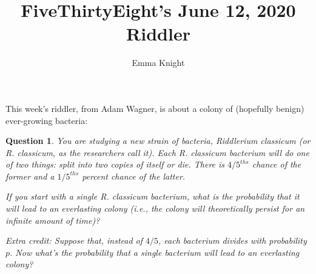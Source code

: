 \documentclass[11pt]{article}
\title{FiveThirtyEight's June 12, 2020 Riddler}
\author{Emma Knight}
\newtheorem{question}[theorem]{Question}
\theoremstyle{definition}
\begin{document}
\maketitle
This week's riddler, from Adam Wagner, is about a colony of (hopefully benign) ever-growing bacteria:
\begin{question}
You are studying a new strain of bacteria, \emph{Riddlerium classicum} (or \emph{R. classicum}, as the researchers call it). Each \emph{R. classicum} bacterium will do one of two things: split into two copies of itself or die. There is $4/5^{ths}$ chance of the former and a $1/5^{ths}$ percent chance of the latter.

If you start with a single \emph{R. classicum} bacterium, what is the probability that it will lead to an everlasting colony (i.e., the colony will theoretically persist for an infinite amount of time)?

Extra credit: Suppose that, instead of $4/5$, each bacterium divides with probability $p$. Now what's the probability that a single bacterium will lead to an everlasting colony?
\end{question}
\end{document}
